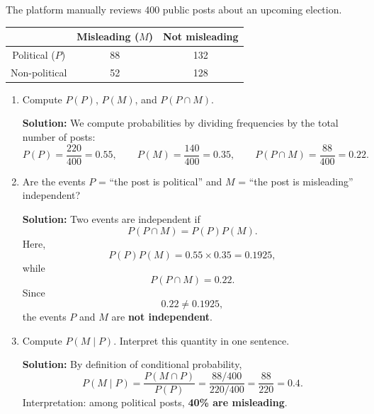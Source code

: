 \documentclass[11pt]{exam}
\begin{document}
\begin{questions}

\question[3]
The platform manually reviews 400 public posts about an upcoming election.

\begin{center}
\begin{tabular}{ccc}
 & Misleading ($M$) & Not misleading \\
\hline
Political ($P$) & 88 & 132 \\
Non-political & 52 & 128 \\
\hline
\end{tabular}
\end{center}

\begin{enumerate}[leftmargin = 0.5cm, label = (\alph*), rightmargin = 0.2cm]
    \item Compute $P(P)$, $P(M)$, and $P(P \cap M)$.

    \begin{solutionorbox}[4.5cm]
    \textbf{Solution:} We compute probabilities by dividing frequencies by the total number of posts:
    \[
    P(P)=\frac{220}{400}=0.55, \qquad
    P(M)=\frac{140}{400}=0.35, \qquad
    P(P\cap M)=\frac{88}{400}=0.22.
    \]
    \end{solutionorbox}

    \item Are the events $P$ = ``the post is political'' and $M$ = ``the post is misleading'' independent?

    \begin{solutionorbox}[5.5cm]
    \textbf{Solution:} Two events are independent if
    \[
    P(P\cap M)=P(P)P(M).
    \]
    Here,
    \[
    P(P)P(M)=0.55 \times 0.35 = 0.1925,
    \]
    while
    \[
    P(P\cap M)=0.22.
    \]
    Since
    \[
    0.22 \neq 0.1925,
    \]
    the events $P$ and $M$ are \textbf{not independent}.
    \end{solutionorbox}

    \item Compute $P(M \mid P)$. Interpret this quantity in one sentence.

    \begin{solutionorbox}[4.5cm]
    \textbf{Solution:} By definition of conditional probability,
    \[
    P(M\mid P)=\frac{P(M\cap P)}{P(P)}=\frac{88/400}{220/400}=\frac{88}{220}=0.4.
    \]
    Interpretation: among political posts, \textbf{40\% are misleading}.
    \end{solutionorbox}
\end{enumerate}


\end{questions}
\end{document}
